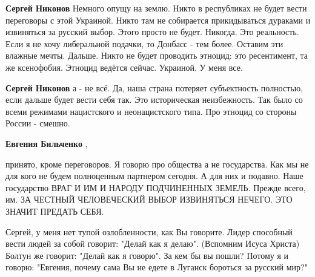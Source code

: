 \begin{itemize}
\begin{itemize}
 
\textbf{Сергей Никонов} Немного опущу на землю. Никто в республиках не будет
вести переговоры с этой Украиной. Никто там не собирается прикидываться
дураками и извиняться за русский выбор. Этого просто не будет. Никогда. Это
реальность. Если я не хочу либеральной подачки, то Донбасс - тем более. Оставим
эти влажные мечты. Дальше. Никто не будет проводить этноцид: это ресентимент,
та же ксенофобия. Этноцид ведётся сейчас. Украиной. У меня все.

 
\textbf{Сергей Никонов} а - не всё. Да, наша страна потеряет субъектность
полностью, если дальше будет вести себя так. Это историческая неизбежность. Так
было со всеми режимами нацистского и неонацистского типа. Про этноцид со
стороны России - смешно.

 
\textbf{Евгения Бильченко} , 

принято, кроме переговоров. Я говорю про общества
а не государства. Как мы не для кого не будем полноценным партнером сегодня. А
для них и подавно. Наше государство ВРАГ И ИМ И НАРОДУ ПОДЧИНЕННЫХ ЗЕМЕЛЬ.
Прежде всего, им. ЗА ЧЕСТНЫЙ ЧЕЛОВЕЧЕСКИЙ ВЫБОР ИЗВИНЯТЬСЯ НЕЧЕГО. ЭТО ЗНАЧИТ
ПРЕДАТЬ СЕБЯ.

 

Сергей, у меня нет тупой озлобленности, как Вы говорите. Лидер способный вести
людей за собой говорит: "Делай как я делаю". (Вспомним Исуса Христа) Болтун же
говорит: "Делай как я говорю". За кем бы вы пошли? Потому я и говорю: "Евгения,
почему сама Вы не едете в Луганск бороться за русский мир?"


\end{itemize}
\end{itemize}

